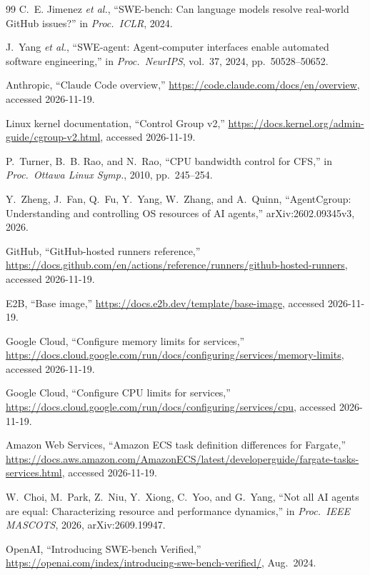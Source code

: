 \begin{thebibliography}{99}
C.~E. Jimenez \emph{et al.}, ``SWE-bench: Can language models resolve real-world GitHub
issues?'' in \emph{Proc.\ ICLR}, 2024.

J.~Yang \emph{et al.}, ``SWE-agent: Agent-computer interfaces enable automated software
engineering,'' in \emph{Proc.\ NeurIPS}, vol.~37, 2024, pp.\ 50528--50652.

Anthropic, ``Claude Code overview,''
\url{https://code.claude.com/docs/en/overview}, accessed 2026-11-19.

Linux kernel documentation, ``Control Group v2,''
\url{https://docs.kernel.org/admin-guide/cgroup-v2.html}, accessed 2026-11-19.

P.~Turner, B.~B. Rao, and N.~Rao, ``CPU bandwidth control for CFS,'' in \emph{Proc.\ Ottawa Linux Symp.}, 2010, pp.\ 245--254.

Y.~Zheng, J.~Fan, Q.~Fu, Y.~Yang, W.~Zhang, and A.~Quinn,
``AgentCgroup: Understanding and controlling OS resources of AI agents,''
arXiv:2602.09345v3, 2026.

GitHub, ``GitHub-hosted runners reference,''
\url{https://docs.github.com/en/actions/reference/runners/github-hosted-runners}, accessed 2026-11-19.

E2B, ``Base image,''
\url{https://docs.e2b.dev/template/base-image}, accessed 2026-11-19.

Google Cloud, ``Configure memory limits for services,''
\url{https://docs.cloud.google.com/run/docs/configuring/services/memory-limits}, accessed 2026-11-19.

Google Cloud, ``Configure CPU limits for services,''
\url{https://docs.cloud.google.com/run/docs/configuring/services/cpu}, accessed 2026-11-19.

Amazon Web Services, ``Amazon ECS task definition differences for Fargate,''
\url{https://docs.aws.amazon.com/AmazonECS/latest/developerguide/fargate-tasks-services.html}, accessed 2026-11-19.

W.~Choi, M.~Park, Z.~Niu, Y.~Xiong, C.~Yoo, and G.~Yang, ``Not all AI agents
are equal: Characterizing resource and performance dynamics,'' in
\emph{Proc.\ IEEE MASCOTS}, 2026, arXiv:2609.19947.

OpenAI, ``Introducing SWE-bench Verified,''
\url{https://openai.com/index/introducing-swe-bench-verified/}, Aug.\ 2024.


\end{thebibliography}
